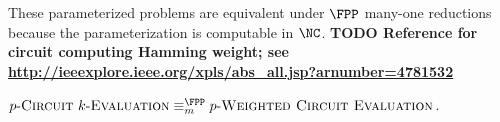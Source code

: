 \documentclass{article}
\newcommand{\todo}[1]{\textbf{TODO #1}}
\newcommand{\dash}{\textnormal{-}}
\newcommand{\pwce}{p\dash\textsc{Weighted Circuit Evaluation}}
\newcommand{\pcke}{p\dash\textsc{Circuit}\text{ }k\dash\textsc{Evaluation}}
\begin{document}
These parameterized problems are equivalent under $\FPP$ many-one reductions because the parameterization is computable in $\NC$.
\todo{Reference for circuit computing Hamming weight; see \url{http://ieeexplore.ieee.org/xpls/abs_all.jsp?arnumber=4781532}}

\begin{proposition}
  $\pcke \equiv_m^{\FPP} \pwce$.
\end{proposition}



\end{document}
